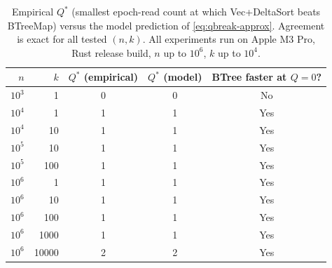 \begin{table}[H]
\centering
\small
\begin{tabular}{@{}rr|ccc@{}}
\toprule
$n$ & $k$ & $Q^*$ (empirical) & $Q^*$ (model) & BTree faster at $Q=0$? \\
\midrule
$10^3$ & 1    & 0 & 0 & No  \\
$10^4$ & 1    & 1 & 1 & Yes \\
$10^4$ & 10   & 1 & 1 & Yes \\
$10^5$ & 10   & 1 & 1 & Yes \\
$10^5$ & 100  & 1 & 1 & Yes \\
$10^6$ & 1    & 1 & 1 & Yes \\
$10^6$ & 10   & 1 & 1 & Yes \\
$10^6$ & 100  & 1 & 1 & Yes \\
$10^6$ & 1000 & 1 & 1 & Yes \\
$10^6$ & 10000& 2 & 2 & Yes \\
\bottomrule
\end{tabular}
\caption{%
  Empirical $Q^*$ (smallest epoch-read count at which Vec+DeltaSort beats BTreeMap)
  versus the model prediction of \eqref{eq:qbreak-approx}.
  Agreement is exact for all tested $(n,k)$.
  All experiments run on Apple M3 Pro, Rust release build, $n$ up to $10^6$,
  $k$ up to $10^4$.
}
\label{tab:qbreak}
\end{table}
